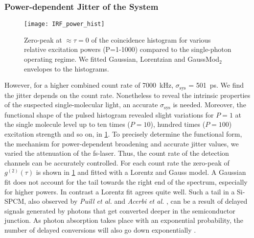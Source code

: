 \subsubsection{Power-dependent Jitter of the System}\label{sec:powerjitter}
\begin{figure}[h!]
	\centering
	\texttt{[image: IRF\_power\_hist]}
	\caption{Zero-peak at $\approx\tau=0$ of the coincidence histogram for various relative excitation powers (P=1-1000) compared to the single-photon operating regime. We fitted Gaussian, Lorentzian and GaussMod$_2$ envelopes to the histograms.}
	\label{fig:IRF_power_hist}
\end{figure}
\noindent However, for a higher combined count rate of \SI{7000}{\kHz}, $\sigma_\mathrm{sys}$ = \SI{501}{\ps}. We find the jitter depends on the count rate. Nonetheless to reveal the intrinsic properties of the suspected single-molecular light, an accurate $\sigma_\mathrm{sys}$ is needed.
Moreover, the functional shape of the pulsed histogram revealed slight variations for $P=1$ at the single molecule level up to ten times ($P=10$), hundred times ($P=100$) excitation strength and so on, in \cref{fig:IRF_power_hist}.
To precisely determine the functional form, the mechanism for power-dependent broadening and accurate jitter values, we varied the attenuation of the fs-laser. 
Thus, the count rate of the detection channels can be accurately controlled. For each count rate the zero-peak of $g^{(2)}(\tau)$ is shown in \cref{fig:IRF_power_hist} and fitted with a Lorentz and Gauss model. A Gaussian fit does not account for the tail towards the right end of the spectrum, especially for higher powers. In contrast a Lorentz fit agrees quite well. Such a tail in a Si-\ac{SPCM}, also observed by \textit{Puill et al.} \cite{nemallapudi_single_2016} and \textit{Acerbi et al.} \cite{acerbi_characterization_2014}, can be a result of delayed signals generated by photons that get converted deeper in the semiconductor junction. As photon absorption takes place with an exponential probability, the number of delayed conversions will also go down exponentially \cite{brunner_comprehensive_2016}.
